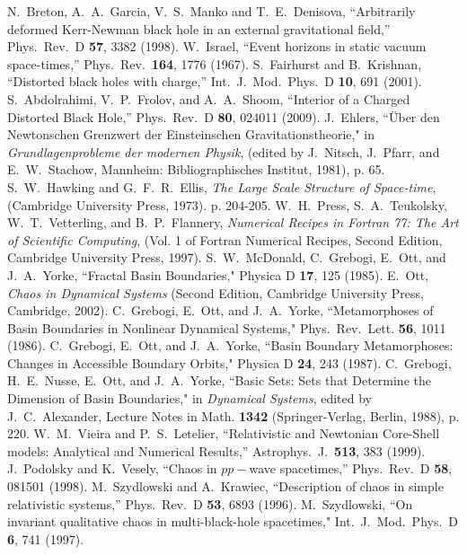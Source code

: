 \documentclass[twocolumn,showpacs,preprintnumbers,amsmath,amssymb,floatfix,nofootinbib]{revtex4-1}
\begin{document}
\begin{thebibliography}{99}
 N.~Breton, A.~A.~Garcia, V.~S.~Manko and T.~E.~Denisova, ``Arbitrarily deformed Kerr-Newman black hole in an external gravitational field,'' Phys.\ Rev.\ D {\bf 57}, 3382 (1998).
 W.~Israel, ``Event horizons in static vacuum space-times,'' Phys.\ Rev.\  {\bf 164}, 1776 (1967).
 S.~Fairhurst and B.~Krishnan, ``Distorted black holes with charge,'' Int.\ J.\ Mod.\ Phys.\ D {\bf 10}, 691 (2001).
 S.~Abdolrahimi, V.~P.~Frolov, and A.~A.~Shoom, ``Interior of a Charged Distorted Black Hole,'' Phys.\ Rev.\ D {\bf 80}, 024011 (2009).
 J.~Ehlers, ``\"Uber den Newtonschen Grenzwert der Einsteinschen Gravitationstheorie," in {\em Grundlagenprobleme der modernen Physik}, (edited by J.~Nitsch, J.~Pfarr, and E.~W.~Stachow, Mannheim: Bibliographisches Institut, 1981), p. 65.
 S.~W.~Hawking and G.~F.~R.~Ellis, {\em The Large Scale Structure of Space-time}, (Cambridge University Press, 1973). p. 204-205. 
 W.~H.~Press, S.~A.~Teukolsky, W.~T.~Vetterling, and B.~P.~Flannery, {\em Numerical Recipes in Fortran 77: The Art of Scientific Computing}, (Vol. 1 of Fortran Numerical Recipes, Second Edition, Cambridge University Press, 1997).
 S.~W.~McDonald, C.~Grebogi, E.~Ott, and J.~A.~Yorke, ``Fractal Basin Boundaries," Physica D {\bf 17}, 125 (1985).
 E.~Ott, {\em Chaos in Dynamical Systems} (Second Edition, Cambridge University Press, Cambridge, 2002).
 C.~Grebogi, E.~Ott, and J.~A.~Yorke, ``Metamorphoses of Basin Boundaries in Nonlinear Dynamical Systems," Phys.\ Rev.\ Lett. {\bf 56}, 1011 (1986).
 C.~Grebogi, E.~Ott, and J.~A.~Yorke, ``Basin Boundary Metamorphoses: Changes in Accessible Boundary Orbits," Physica D {\bf 24}, 243 (1987).
 C.~Grebogi, H.~E.~Nusse, E.~Ott, and J.~A.~Yorke, ``Basic Sets: Sets that Determine the Dimension of Basin Boundaries," in {\em Dynamical Systems}, edited by J.~C.~Alexander, Lecture Notes in Math. {\bf 1342} (Springer-Verlag, Berlin, 1988), p. 220.
 W.~M.~Vieira and P.~S.~Letelier, ``Relativistic and Newtonian Core-Shell models: Analytical and Numerical Results,'' Astrophys.\ J.\  {\bf 513}, 383 (1999).
 J.~Podolsky and K.~Vesely, ``Chaos in $pp-$wave spacetimes,'' Phys.\ Rev.\ D {\bf 58}, 081501 (1998).
 M.~Szydlowski and A.~Krawiec, ``Description of chaos in simple relativistic systems,'' Phys.\ Rev.\ D {\bf 53}, 6893 (1996).
 M.~Szydlowski, ``On invariant qualitative chaos in multi-black-hole spacetimes," Int.\ J.\ Mod.\ Phys.\ D {\bf 6}, 741 (1997).

\end{thebibliography}
\end{document}
